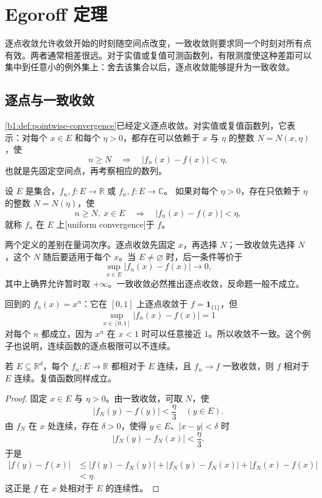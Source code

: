 \section{Egoroff 定理}
\label{b1:sec:0405}

逐点收敛允许收敛开始的时刻随空间点改变，一致收敛则要求同一个时刻对所有点有效。两者通常相差很远。对于实值或复值可测函数列，有限测度使这种差距可以集中到任意小的例外集上：舍去该集合以后，逐点收敛能够提升为一致收敛。

\subsection{逐点与一致收敛}
\label{b1:subsec:040501}

\cref{b1:def:pointwise-convergence}已经定义逐点收敛。对实值或复值函数列，它表示：对每个 \(x\in E\) 和每个 \(\eta>0\)，都存在可以依赖于 \(x\) 与 \(\eta\) 的整数 \(N=N(x,\eta)\)，使
\[
n\geq N
\quad\Longrightarrow\quad
|f_n(x)-f(x)|<\eta,
\]
也就是先固定空间点，再考察相应的数列。

\begin{definition}
\label{b1:def:uniform-convergence}
设 \(E\) 是集合，\(f_n,f:E\rightarrow\mathbb R\) 或
\(f_n,f:E\rightarrow\mathbb C\)。
如果对每个 \(\eta>0\)，存在只依赖于 \(\eta\) 的整数
\(N=N(\eta)\)，使
\[
n\geq N,\ x\in E
\quad\Longrightarrow\quad
|f_n(x)-f(x)|<\eta,
\]
就称 \(f_n\) 在 \(E\) 上[uniform convergence]于 \(f\)。
\end{definition}

两个定义的差别在量词次序。逐点收敛先固定 \(x\)，再选择 \(N\)；一致收敛先选择 \(N\)，这个 \(N\) 随后要适用于每个 \(x\)。当 \(E\ne\varnothing\) 时，后一条件等价于
\[
\sup_{x\in E}|f_n(x)-f(x)|\longrightarrow0,
\]
其中上确界允许暂时取 \(+\infty\)。一致收敛必然推出逐点收敛，反命题一般不成立。

\ProseParagraphBreak

回到的 \(f_n(x)=x^n\)：它在 \([0,1]\) 上逐点收敛于 \(f=\mathbf 1_{\{1\}}\)，但
\[
\sup_{x\in[0,1]}|f_n(x)-f(x)|=1
\]
对每个 \(n\) 都成立，因为 \(x^n\) 在 \(x<1\) 时可以任意接近
\(1\)。所以收敛不一致。这个例子也说明，连续函数的逐点极限可以不连续。

\begin{proposition}
\label{b1:prop:uniform-limit-continuous}
若 \(E\subseteq\mathbb R^d\)，每个 \(f_n:E\rightarrow\mathbb R\) 都相对于 \(E\) 连续，且 \(f_n\to f\) 一致收敛，则 \(f\) 相对于 \(E\) 连续。复值函数同样成立。
\end{proposition}
\begin{proof}
固定 \(x\in E\) 与 \(\eta>0\)。由一致收敛，可取 \(N\)，使
\[
|f_N(y)-f(y)|<\frac{\eta}{3}
\quad(y\in E).
\]
由 \(f_N\) 在 \(x\) 处连续，存在 \(\delta>0\)，使得
\(y\in E\)、\(|x-y|<\delta\) 时
\[
|f_N(y)-f_N(x)|<\frac{\eta}{3}.
\]
于是
\begin{align*}
|f(y)-f(x)|
&\leq |f(y)-f_N(y)|+|f_N(y)-f_N(x)|+|f_N(x)-f(x)|\\
&<\eta.
\end{align*}
这正是 \(f\) 在 \(x\) 处相对于 \(E\) 的连续性。
\end{proof}

